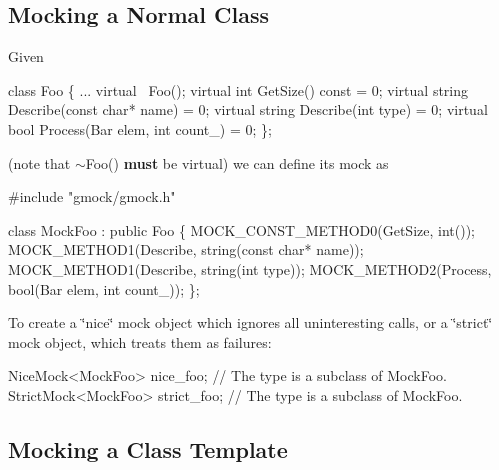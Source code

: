 \subsection*{Mocking a Normal Class}

Given 
\begin{DoxyCode}
\textcolor{keyword}{class }Foo \{
  ...
  \textcolor{keyword}{virtual} ~Foo();
  \textcolor{keyword}{virtual} \textcolor{keywordtype}{int} GetSize() \textcolor{keyword}{const} = 0;
  \textcolor{keyword}{virtual} \textcolor{keywordtype}{string} Describe(\textcolor{keyword}{const} \textcolor{keywordtype}{char}* name) = 0;
  \textcolor{keyword}{virtual} \textcolor{keywordtype}{string} Describe(\textcolor{keywordtype}{int} type) = 0;
  \textcolor{keyword}{virtual} \textcolor{keywordtype}{bool} Process(Bar elem, \textcolor{keywordtype}{int} count_) = 0;
\};
\end{DoxyCode}
 (note that {\ttfamily $\sim$\+Foo()} {\bfseries must} be virtual) we can define its mock as 
\begin{DoxyCode}
\textcolor{preprocessor}{#include "gmock/gmock.h"}

\textcolor{keyword}{class }MockFoo : \textcolor{keyword}{public} Foo \{
  MOCK\_CONST\_METHOD0(GetSize, \textcolor{keywordtype}{int}());
  MOCK\_METHOD1(Describe, \textcolor{keywordtype}{string}(\textcolor{keyword}{const} \textcolor{keywordtype}{char}* name));
  MOCK\_METHOD1(Describe, \textcolor{keywordtype}{string}(\textcolor{keywordtype}{int} type));
  MOCK\_METHOD2(Process, \textcolor{keywordtype}{bool}(Bar elem, \textcolor{keywordtype}{int} count_));
\};
\end{DoxyCode}


To create a \char`\"{}nice\char`\"{} mock object which ignores all uninteresting calls, or a \char`\"{}strict\char`\"{} mock object, which treats them as failures\+: 
\begin{DoxyCode}
NiceMock<MockFoo> nice\_foo;     \textcolor{comment}{// The type is a subclass of MockFoo.}
StrictMock<MockFoo> strict\_foo; \textcolor{comment}{// The type is a subclass of MockFoo.}
\end{DoxyCode}


\subsection*{Mocking a Class Template}

